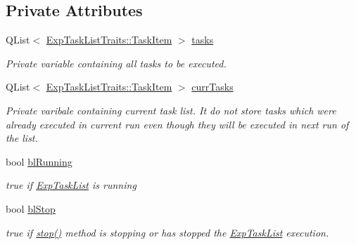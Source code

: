 \subsection*{Private Attributes}
\begin{DoxyCompactItemize}
\item 
\hypertarget{class_exp_task_list_a2c6fef3959dbd632a927ca789f657d05}{}Q\+List$<$ \hyperlink{struct_exp_task_list_traits_1_1_task_item}{Exp\+Task\+List\+Traits\+::\+Task\+Item} $>$ \hyperlink{class_exp_task_list_a2c6fef3959dbd632a927ca789f657d05}{tasks}\label{class_exp_task_list_a2c6fef3959dbd632a927ca789f657d05}

\begin{DoxyCompactList}\small\item\em Private variable containing all tasks to be executed. \end{DoxyCompactList}\item 
\hypertarget{class_exp_task_list_abfeadd157333249e79ee8ff98ba98cf2}{}Q\+List$<$ \hyperlink{struct_exp_task_list_traits_1_1_task_item}{Exp\+Task\+List\+Traits\+::\+Task\+Item} $>$ \hyperlink{class_exp_task_list_abfeadd157333249e79ee8ff98ba98cf2}{curr\+Tasks}\label{class_exp_task_list_abfeadd157333249e79ee8ff98ba98cf2}

\begin{DoxyCompactList}\small\item\em Private varibale containing current task list. It do not store tasks which were already executed in current run even though they will be executed in next run of the list. \end{DoxyCompactList}\item 
\hypertarget{class_exp_task_list_a1f3833f849f349d37a44a69b09b547b6}{}bool \hyperlink{class_exp_task_list_a1f3833f849f349d37a44a69b09b547b6}{bl\+Running}\label{class_exp_task_list_a1f3833f849f349d37a44a69b09b547b6}

\begin{DoxyCompactList}\small\item\em true if \hyperlink{class_exp_task_list}{Exp\+Task\+List} is running \end{DoxyCompactList}\item 
\hypertarget{class_exp_task_list_aa7bfbd7aece2b214647e15d26b32905b}{}bool \hyperlink{class_exp_task_list_aa7bfbd7aece2b214647e15d26b32905b}{bl\+Stop}\label{class_exp_task_list_aa7bfbd7aece2b214647e15d26b32905b}

\begin{DoxyCompactList}\small\item\em true if \hyperlink{class_exp_task_list_ae3542825c792c23c1f2a54b9d63074d1}{stop()} method is stopping or has stopped the \hyperlink{class_exp_task_list}{Exp\+Task\+List} execution. \end{DoxyCompactList}\end{DoxyCompactItemize}


